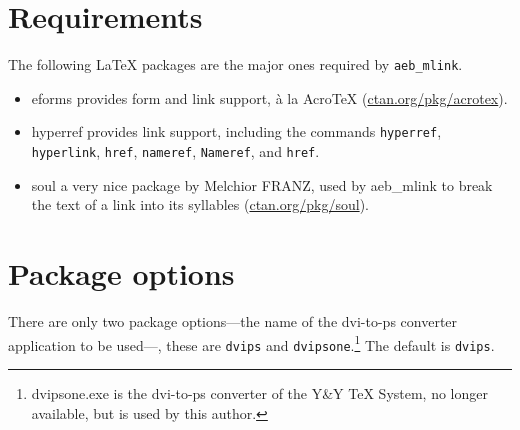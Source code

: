 \documentclass{article}
\makeatletter
\let\pkg\textsf
\let\opt\texttt
\let\app\textsf
\def\cs#1{\texttt{\@backslashchar#1}}
\makeatother
\begin{document}
\section{Requirements}

The following {\LaTeX} packages are the major ones required by \texttt{aeb\_mlink}.
\begin{itemize}
    \item \pkg{eforms} provides form and link support, \`a la
        {Acro\negthinspace\TeX} (\href{http://www.ctan.org/pkg/acrotex}{ctan.org/pkg/acrotex}).
    \item \pkg{hyperref} provides link support, including the
        commands \cs{hyperref}, \cs{hyperlink}, \cs{href}, \cs{nameref},
        \cs{Nameref}, and \cs{href}.
    \item \pkg{soul} a very nice package by Melchior FRANZ, used by
        \pkg{aeb\_mlink} to break the text of a link into its syllables (\href{http://www.ctan.org/pkg/soul}{ctan.org/pkg/soul}).

\end{itemize}

\section{Package options}

There are only two package options---the name of the dvi-to-ps converter application to be used---,
these are \opt{dvips} and \opt{dvipsone}.\footnote{\app{dvipsone.exe} is the dvi-to-ps converter
of the Y\&Y {\TeX} System, no longer available, but is used by this author.} The default is \opt{dvips}.

\end{document}
